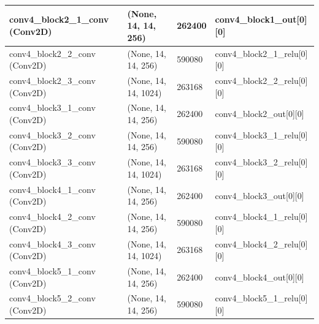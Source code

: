 \documentclass[12pt,oneside,geqno]{article}
\begin{document}
\begin{table}[]
{\begin{tabular}{llll}
				\multicolumn{1}{|l|}{conv4\_block2\_1\_conv (Conv2D)}  & \multicolumn{1}{l|}{(None, 14, 14, 256)}  & \multicolumn{1}{l|}{262400}  & \multicolumn{1}{l|}{conv4\_block1\_out{[}0{]}{[}0{]}}     \\ \hline
				\multicolumn{1}{|l|}{conv4\_block2\_2\_conv (Conv2D)}  & \multicolumn{1}{l|}{(None, 14, 14, 256)}  & \multicolumn{1}{l|}{590080}  & \multicolumn{1}{l|}{conv4\_block2\_1\_relu{[}0{]}{[}0{]}} \\ \hline
				\multicolumn{1}{|l|}{conv4\_block2\_3\_conv (Conv2D)}  & \multicolumn{1}{l|}{(None, 14, 14, 1024)} & \multicolumn{1}{l|}{263168}  & \multicolumn{1}{l|}{conv4\_block2\_2\_relu{[}0{]}{[}0{]}} \\ \hline
				\multicolumn{1}{|l|}{conv4\_block3\_1\_conv (Conv2D)}  & \multicolumn{1}{l|}{(None, 14, 14, 256)}  & \multicolumn{1}{l|}{262400}  & \multicolumn{1}{l|}{conv4\_block2\_out{[}0{]}{[}0{]}}     \\ \hline
				\multicolumn{1}{|l|}{conv4\_block3\_2\_conv (Conv2D)}  & \multicolumn{1}{l|}{(None, 14, 14, 256)}  & \multicolumn{1}{l|}{590080}  & \multicolumn{1}{l|}{conv4\_block3\_1\_relu{[}0{]}{[}0{]}} \\ \hline
				\multicolumn{1}{|l|}{conv4\_block3\_3\_conv (Conv2D)}  & \multicolumn{1}{l|}{(None, 14, 14, 1024)} & \multicolumn{1}{l|}{263168}  & \multicolumn{1}{l|}{conv4\_block3\_2\_relu{[}0{]}{[}0{]}} \\ \hline
				\multicolumn{1}{|l|}{conv4\_block4\_1\_conv (Conv2D)}  & \multicolumn{1}{l|}{(None, 14, 14, 256)}  & \multicolumn{1}{l|}{262400}  & \multicolumn{1}{l|}{conv4\_block3\_out{[}0{]}{[}0{]}}     \\ \hline
				\multicolumn{1}{|l|}{conv4\_block4\_2\_conv (Conv2D)}  & \multicolumn{1}{l|}{(None, 14, 14, 256)}  & \multicolumn{1}{l|}{590080}  & \multicolumn{1}{l|}{conv4\_block4\_1\_relu{[}0{]}{[}0{]}} \\ \hline
				\multicolumn{1}{|l|}{conv4\_block4\_3\_conv (Conv2D)}  & \multicolumn{1}{l|}{(None, 14, 14, 1024)} & \multicolumn{1}{l|}{263168}  & \multicolumn{1}{l|}{conv4\_block4\_2\_relu{[}0{]}{[}0{]}} \\ \hline
				\multicolumn{1}{|l|}{conv4\_block5\_1\_conv (Conv2D)}  & \multicolumn{1}{l|}{(None, 14, 14, 256)}  & \multicolumn{1}{l|}{262400}  & \multicolumn{1}{l|}{conv4\_block4\_out{[}0{]}{[}0{]}}     \\ \hline
				\multicolumn{1}{|l|}{conv4\_block5\_2\_conv (Conv2D)}  & \multicolumn{1}{l|}{(None, 14, 14, 256)}  & \multicolumn{1}{l|}{590080}  & \multicolumn{1}{l|}{conv4\_block5\_1\_relu{[}0{]}{[}0{]}} \\ \hline

\end{tabular}}
\end{table}
\end{document}
